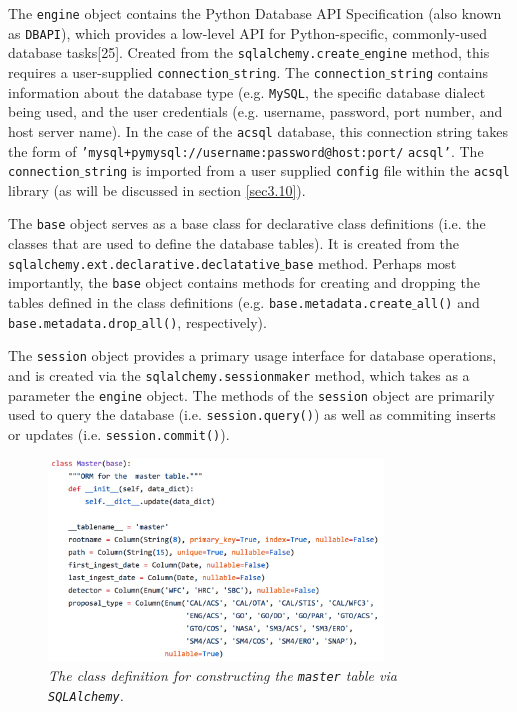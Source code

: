 \documentclass[10pt,journal,compsoc]{IEEEtran}
\begin{document}
The \texttt{engine} object contains the Python Database API Specification (also known as \texttt{DBAPI}), which provides a low-level API for Python-specific, commonly-used
database tasks[25].  Created from the \texttt{sqlalchemy.create$\_$engine} method, this requires a user-supplied \texttt{connection$\_$string}.  The \texttt{connection$\_$string}
contains information about the database type (e.g. \texttt{MySQL}, the specific database dialect being used, and the user credentials (e.g. username, password, port number,
and host server name).  In the case of the \texttt{acsql} database, this connection string takes the form of \texttt{'mysql+pymysql://username:password@host:port/} \texttt{acsql'}.
The \texttt{connection$\_$string} is imported from a user supplied \texttt{config} file within the \texttt{acsql} library (as will be discussed in section \ref{sec3.10}).

The \texttt{base} object serves as a base class for declarative class definitions (i.e. the classes that are used to define the database tables).  It is created from the
\texttt{sqlalchemy.ext.declarative.declatative$\_$base} method.  Perhaps most importantly, the \texttt{base} object contains methods for creating and dropping the tables defined in
the class definitions (e.g. \texttt{base.metadata.create$\_$all()} and \texttt{base.metadata.drop$\_$all()}, respectively).

The \texttt{session} object provides a primary usage interface for database operations, and is created via the \texttt{sqlalchemy.sessionmaker} method, which takes as a parameter the
\texttt{engine} object.  The methods of the \texttt{session} object are primarily used to query the database (i.e. \texttt{session.query()}) as well as commiting inserts or updates (i.e.
\texttt{session.commit()}).

\begin{figure}[!h]
\centering
\includegraphics[width=3.5in]{./figures/master_table.png}
\caption{\textit{The class definition for constructing the \texttt{master} table via \texttt{SQLAlchemy}.}}
\label{fig13}
\end{figure}
\end{document}
